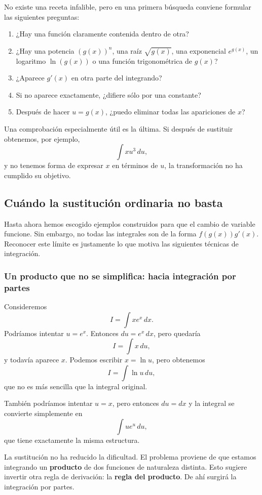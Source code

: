 \documentclass[12pt]{article}
\theoremstyle{definition}\newtheorem{definicion}[teorema]{Definición}\newtheorem{ejemplo}[teorema]{Ejemplo}\newtheorem{ejercicio}[teorema]{Ejercicio}
\theoremstyle{remark}\newtheorem*{observacion}{Observación}\newtheorem*{advertencia}{Advertencia}\newtheorem*{estrategia}{Estrategia}
\begin{document}
No existe una receta infalible, pero en una primera búsqueda conviene formular las siguientes preguntas:
\begin{enumerate}
\item ¿Hay una función claramente contenida dentro de otra?
\item ¿Hay una potencia $(g(x))^n$, una raíz $\sqrt{g(x)}$, una exponencial $e^{g(x)}$, un logaritmo $\ln(g(x))$ o una función trigonométrica de $g(x)$?
\item ¿Aparece $g'(x)$ en otra parte del integrando?
\item Si no aparece exactamente, ¿difiere sólo por una constante?
\item Después de hacer $u=g(x)$, ¿puedo eliminar todas las apariciones de $x$?
\end{enumerate}

Una comprobación especialmente útil es la última. Si después de sustituir obtenemos, por ejemplo,
\[
\int xu^3\,du,
\]
y no tenemos forma de expresar $x$ en términos de $u$, la transformación no ha cumplido su objetivo.

\subsection{Cuándo la sustitución ordinaria no basta}

Hasta ahora hemos escogido ejemplos construidos para que el cambio de variable funcione. Sin embargo, no todas las integrales son de la forma $f(g(x))g'(x)$. Reconocer este límite es justamente lo que motiva las siguientes técnicas de integración.

\subsubsection*{Un producto que no se simplifica: hacia integración por partes}

Consideremos
\[
I=\int xe^x\,dx.
\]
Podríamos intentar $u=e^x$. Entonces $du=e^x\,dx$, pero quedaría
\[
I=\int x\,du,
\]
y todavía aparece $x$. Podemos escribir $x=\ln u$, pero obtenemos
\[
I=\int\ln u\,du,
\]
que no es más sencilla que la integral original.

También podríamos intentar $u=x$, pero entonces $du=dx$ y la integral se convierte simplemente en
\[
\int ue^u\,du,
\]
que tiene exactamente la misma estructura.

La sustitución no ha reducido la dificultad. El problema proviene de que estamos integrando un \textbf{producto} de dos funciones de naturaleza distinta. Esto sugiere invertir otra regla de derivación: la \textbf{regla del producto}. De ahí surgirá la integración por partes.
\end{document}
